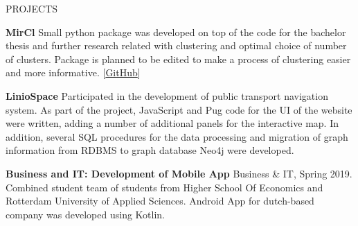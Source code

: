 \documentclass{resume} %
\begin{document}
\begin{rSection}{PROJECTS}
\vspace{-1.25em}
\item \textbf{MirCl} {Small python package was developed on top of the code for the bachelor thesis and further research related with clustering and optimal choice of number of clusters. Package is planned to be edited to make a process of clustering easier and more informative. [\href{https://github.com/glendawur/MirCl}{GitHub}]}
\item \textbf{LinioSpace} {Participated in the development of public transport navigation system. As part of the project, JavaScript and Pug code for the UI of the website were written, adding a number of additional panels for the interactive map. In addition, several SQL procedures for the data processing and migration of graph information from RDBMS to graph database Neo4j were developed.}
\item \textbf{Business and IT: Development of Mobile App} {Business \& IT, Spring 2019. Combined student team of students from Higher School Of Economics and Rotterdam University of Applied Sciences. Android App for dutch-based company was developed using Kotlin.}
\end{rSection} 




\end{document}
